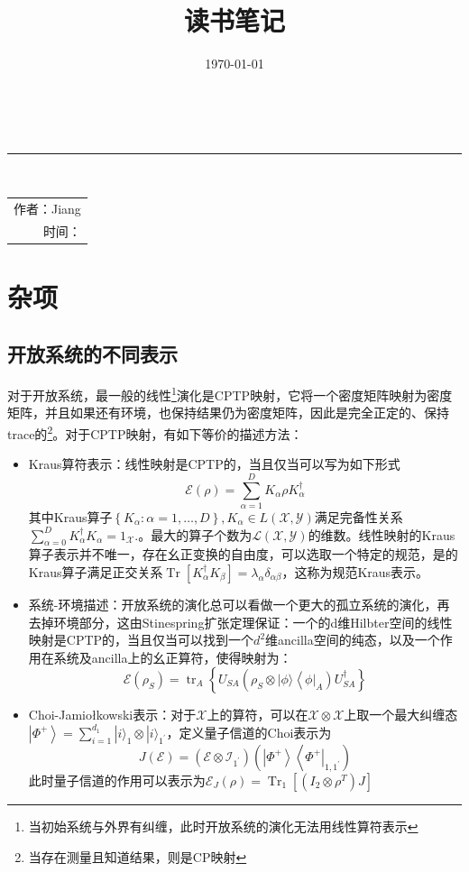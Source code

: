 \documentclass[10pt,openany]{book}
\title{读书笔记}
\date{\today}
\theoremstyle{thmstyle} %
\theoremstyle{defstyle} %
\theoremstyle{prostyle} %
\renewcommand*{\maketitle}{
    \begin{titlepage}
    \newgeometry{margin = 0in}
    \parindent=0pt
    \vfill
    \begin{center}
        \parbox{0.618\textwidth}{
        \hfill {\bfseries \Huge \thetitle} \\[0.6pt]  
        \rule{0.618\textwidth}{4pt} \\ 
    }
    \end{center}
    \vfill
    \begin{center}
        \parbox{0.618\textwidth}{
        \hfill\Large
        \kaishu 
          \begin{tabular}{r|}
          作者：Jiang \\ 
          时间：\thedate \\
        \end{tabular}
        }
    \end{center}
    \vfill
    \begin{center}
        \parbox[t]{0.7\textwidth}{\centering \kaishu }
    \end{center}
    \vfill
\end{titlepage}
\restoregeometry
\thispagestyle{empty}
}
\begin{document}
\frontmatter

\maketitle

\tableofcontents

\mainmatter

\chapter{杂项}
\section{开放系统的不同表示}
对于开放系统，最一般的线性\footnote{当初始系统与外界有纠缠，此时开放系统的演化无法用线性算符表示}演化是CPTP映射，它将一个密度矩阵映射为密度矩阵，并且如果还有环境，也保持结果仍为密度矩阵，因此是完全正定的、保持trace的\footnote{当存在测量且知道结果，则是CP映射}。对于CPTP映射，有如下等价的描述方法：
\begin{itemize}
  \item Kraus算符表示：线性映射是CPTP的，当且仅当可以写为如下形式\\
  \begin{equation}
    \mathcal{E}(\rho)=\sum_{\alpha=1}^D K_\alpha \rho K_\alpha^{\dagger}
  \end{equation}
  其中Kraus算子$ \left\{K_\alpha: \alpha=1, \ldots, D\right\}, K_\alpha \in L(\mathcal{X}, \mathcal{Y}) $满足完备性关系$ \sum_{\alpha=0}^D K_\alpha^{\dagger} K_\alpha=1_{\mathcal{X}} . $。最大的算子个数为$ \mathcal{L}(\mathcal{X}, \mathcal{Y}) $的维数。线性映射的Kraus算子表示并不唯一，存在幺正变换的自由度，可以选取一个特定的规范，是的Kraus算子满足正交关系$ \operatorname{Tr}\left[K_\alpha^{\dagger} K_\beta\right]=\lambda_\alpha \delta_{\alpha \beta} $，这称为规范Kraus表示。    
  \item 系统-环境描述：开放系统的演化总可以看做一个更大的孤立系统的演化，再去掉环境部分，这由Stinespring扩张定理保证：一个的d维Hilbter空间的线性映射是CPTP的，当且仅当可以找到一个$ d^2 $维ancilla空间的纯态，以及一个作用在系统及ancilla上的幺正算符，使得映射为： 
  \begin{equation}
    \mathcal{E}(\rho_S)=\operatorname{tr}_A\left\{U_{S A}\left(\rho_S \otimes|\phi\rangle\left\langle\left.\phi\right|_A\right) U_{S A}^{\dagger}\right\}\right.
  \end{equation} 
  \item Choi-Jamiołkowski表示：对于$ \mathcal{X} $上的算符，可以在$ \mathcal{X}\otimes\mathcal{X} $上取一个最大纠缠态$ \left|\Phi^{+}\right\rangle=\sum_{i=1}^{d_1}|i\rangle_1 \otimes|i\rangle_{1^{\prime}} $，定义量子信道的Choi表示为
  \begin{equation}
    J(\mathcal{E})=\left(\mathcal{E} \otimes \mathcal{I}_{1^{\prime}}\right)\left(\left|\Phi^{+}\right\rangle\left\langle\left.\Phi^{+}\right|_{1,1^{\prime}}\right)\right.
  \end{equation}   
  此时量子信道的作用可以表示为$ \mathcal{E}_J(\rho)=\operatorname{Tr}_1\left[\left(I_2 \otimes \rho^T\right) J\right] $ 
\end{itemize}
\end{document}
